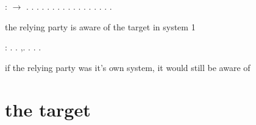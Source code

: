 \documentclass[12pt]{report}
\begin{document}
 
\begin{coqdoccode}
\coqdocemptyline
\coqdocnoindent
{} :     \ensuremath{\rightarrow} .\coqdoceol
\coqdocnoindent
{}.\coqdoceol
\coqdocnoindent
{} . .  . . .  .  .  .  .  .  .  .  .  .\coqdoceol
\coqdocnoindent
{}.\coqdoceol
\coqdocemptyline
\end{coqdoccode}
the relying party is aware of the target in system 1 
\begin{coqdoccode}
\coqdocemptyline
\coqdocnoindent
{} :    .\coqdoceol
\coqdocnoindent
{}.\coqdoceol
\coqdocnoindent
{} ,. . .\coqdoceol
\coqdocnoindent
{}.\coqdoceol
\coqdocemptyline
\end{coqdoccode}
if the relying party was it's own system, it would still be aware of
\section{the target}
\end{document}
